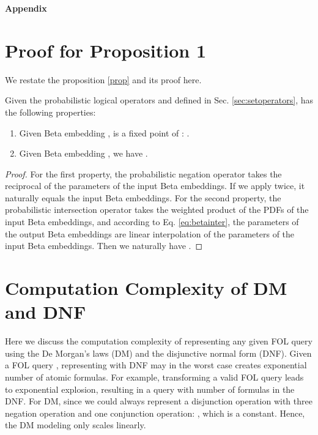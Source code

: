 \newpage

\appendix

\begin{center}
\begin{huge}
\textbf{Appendix}
\end{huge}
\end{center}

\section{Proof for Proposition 1}\label{sec:appendix-proof}
We restate the proposition \ref{prop} and its proof here.
\begin{proposition}
Given the probabilistic logical operators  and  defined in Sec. \ref{sec:setoperators}, \methodname has the following properties:
\begin{enumerate}
    \item Given Beta embedding ,  is a fixed point of : .
    \item Given Beta embedding , we have .
\end{enumerate}
\end{proposition}
\begin{proof}
For the first property, the probabilistic negation operator  takes the reciprocal of the parameters of the input Beta embeddings. If we apply  twice, it naturally equals the input Beta embeddings. For the second property, the probabilistic intersection operator  takes the weighted product of the PDFs of the input Beta embeddings, and according to Eq. \ref{eq:betainter}, the parameters of the output Beta embeddings are linear interpolation of the parameters of the input Beta embeddings. Then we naturally have .
\end{proof}

\section{Computation Complexity of DM and DNF}\label{appendix:complexity}
Here we discuss the computation complexity of representing any given FOL query using the De Morgan's laws (DM) and the disjunctive normal form (DNF). Given a FOL query , representing  with DNF may in the worst case creates exponential number of atomic formulas. For example, transforming a valid FOL query  leads to exponential explosion, resulting in a query with  number of formulas in the DNF. For DM, since we could always represent a disjunction operation with three negation operation and one conjunction operation: , which is a constant. Hence, the DM modeling only scales linearly.


